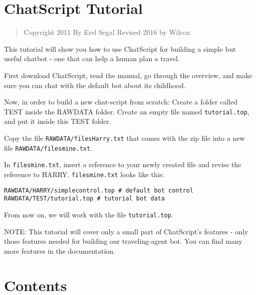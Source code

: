 \documentclass[]{article}
\date{}
\begin{document}
\section{ChatScript Tutorial}\label{chatscript-tutorial}

\begin{quote}
Copyright 2011 By Erel Segal Revised 2016 by Wilcox
\end{quote}

This tutorial will show you how to use ChatScript for building a simple
but useful chatbot - one that can help a human plan a travel.

First download ChatScript, read the manual, go through the overview, and
make sure you can chat with the default bot about its childhood.

Now, in order to build a new chat-script from scratch: Create a folder
called TEST inside the RAWDATA folder. Create an empty file named
\texttt{tutorial.top}, and put it inside this TEST folder.

Copy the file \texttt{RAWDATA/filesHarry.txt} that comes with the zip
file into a new file \texttt{RAWDATA/filesmine.txt}.

In \texttt{filesmine.txt}, insert a reference to your newly created file
and revise the reference to HARRY. \texttt{filesmine.txt} looks like
this:

\begin{verbatim}
RAWDATA/HARRY/simplecontrol.top # default bot control
RAWDATA/TEST/tutorial.top # tutorial bot data
\end{verbatim}

From now on, we will work with the file \texttt{tutorial.top}.

NOTE: This tutorial will cover only a small part of ChatScript's
features - only those features needed for building our traveling-agent
bot. You can find many more features in the documentation.

\section{Contents}\label{contents}
\end{document}
